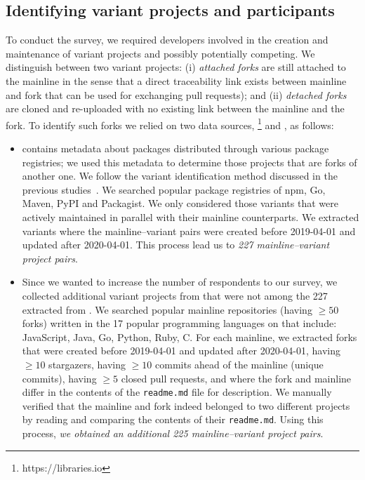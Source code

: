 

\subsection{Identifying variant projects and participants}
\label{sec:forks_and_participants}
To conduct the survey, we required developers involved in the creation and maintenance of variant projects and possibly potentially competing. We distinguish between two variant projects: (i) \emph{attached forks} are still attached to the mainline in the sense that a direct traceability link exists between mainline and fork that can be used for exchanging pull requests); and (ii) \emph{detached forks} are cloned and re-uploaded with no existing link between the mainline and the fork.
To identify such forks we relied on two data sources, \librariesio\footnote{https://libraries.io} and \gh, as follows:
\begin{itemize}
\item \librariesio contains metadata about packages distributed through various package registries; we used this metadata to determine those projects that are forks of another one. We follow the variant identification method discussed in the previous studies~\cite{businge:emse:2021,businge:benevol:2020}. We searched popular package registries of npm, Go, Maven, PyPI and Packagist.
We only considered those variants that were actively maintained in parallel with their mainline counterparts. We extracted variants where the mainline--variant pairs were created before 2019-04-01 and updated after 2020-04-01.
This process lead us to \textit{227 mainline–variant project pairs}.

\item Since we wanted to increase the number of respondents to our survey, we  collected additional variant projects from \gh that were not among the 227 extracted from \librariesio. We searched popular mainline repositories (having $\geq 50$ forks) written in the 17 popular programming languages on \gh that include: JavaScript, Java, Go, Python, Ruby, C.  For each mainline, we extracted forks that were created before 2019-04-01 and updated after 2020-04-01, having $\geq 10$ stargazers, having $\geq 10$ commits ahead of the mainline (unique commits), having $\geq 5$ closed pull requests, and where the fork and mainline differ in the contents of the \texttt{readme.md} file for description.
 We manually verified that the mainline and fork indeed belonged to two different projects by reading and comparing the contents of their \texttt{readme.md}. Using this process, \textit{we obtained an additional 225 mainline–variant project pairs}.
\end{itemize}

